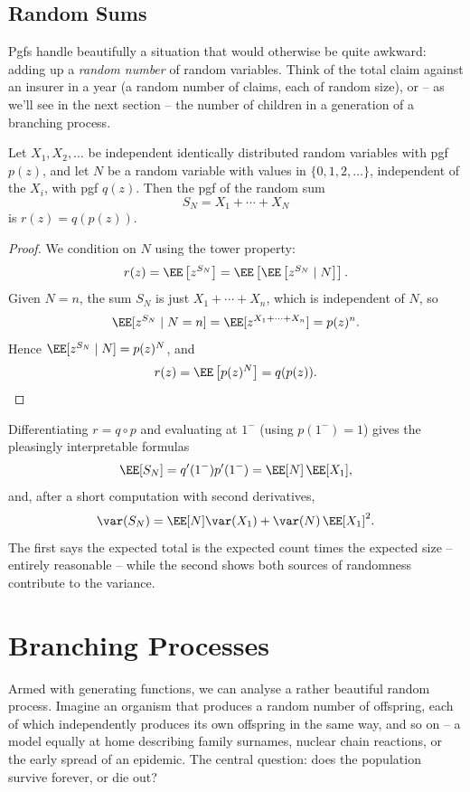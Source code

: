 \subsection{Random Sums}

Pgfs handle beautifully a situation that would otherwise be quite awkward: adding up a \emph{random number} of random variables. Think of the total claim against an insurer in a year (a random number of claims, each of random size), or -- as we'll see in the next section -- the number of children in a generation of a branching process.

\begin{theorem}
	Let $X_1, X_2, \dots$ be independent identically distributed random variables with pgf $p(z)$, and let $N$ be a random variable with values in $\{0, 1, 2, \dots\}$, independent of the $X_i$, with pgf $q(z)$. Then the pgf of the random sum
	$$
	S_N = X_1 + \cdots + X_N
	$$
	is $r(z) = q(p(z))$.
\end{theorem}
\begin{proof}
	We condition on $N$ using the tower property:
	$$
	r(z) = \EE\left[z^{S_N}\right] = \EE\left[\EE\left[z^{S_N} \mid N\right]\right].
	$$
	Given $N = n$, the sum $S_N$ is just $X_1 + \cdots + X_n$, which is independent of $N$, so
	$$
	\EE[z^{S_N} \mid N = n] = \EE[z^{X_1 + \cdots + X_n}] = p(z)^n.
	$$
	Hence $\EE[z^{S_N} \mid N] = p(z)^N$, and
	$$
	r(z) = \EE\left[p(z)^N\right] = q(p(z)). \qedhere
	$$
\end{proof}

Differentiating $r = q \circ p$ and evaluating at $1^-$ (using $p(1^-) = 1$) gives the pleasingly interpretable formulas
$$
\EE[S_N] = q'(1^-)p'(1^-) = \EE[N]\,\EE[X_1],
$$
and, after a short computation with second derivatives,
$$
\var(S_N) = \EE[N]\var(X_1) + \var(N)\,\EE[X_1]^2.
$$
The first says the expected total is the expected count times the expected size -- entirely reasonable -- while the second shows both sources of randomness contribute to the variance.


\section{Branching Processes}

Armed with generating functions, we can analyse a rather beautiful random process. Imagine an organism that produces a random number of offspring, each of which independently produces its own offspring in the same way, and so on -- a model equally at home describing family surnames, nuclear chain reactions, or the early spread of an epidemic. The central question: does the population survive forever, or die out?

